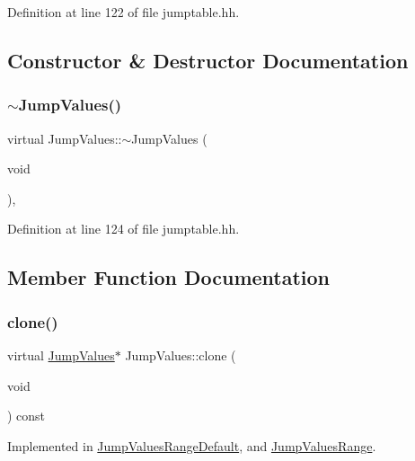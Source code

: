 Definition at line 122 of file jumptable.\+hh.



\subsection{Constructor \& Destructor Documentation}
\mbox{\label{class_jump_values_a690f7467bd51de193ab5f4f82a615296}} 
\subsubsection{\texorpdfstring{$\sim$JumpValues()}{~JumpValues()}}
{\footnotesize\ttfamily virtual Jump\+Values\+::$\sim$\+Jump\+Values (\begin{DoxyParamCaption}\item[{void}]{ }\end{DoxyParamCaption})\hspace{0.3cm}{\ttfamily [inline]}, {\ttfamily [virtual]}}



Definition at line 124 of file jumptable.\+hh.



\subsection{Member Function Documentation}
\mbox{\label{class_jump_values_adfe4b22f78bedc2e90488a820dd86d3e}} 
\subsubsection{\texorpdfstring{clone()}{clone()}}
{\footnotesize\ttfamily virtual \mbox{\hyperlink{class_jump_values}{Jump\+Values}}$\ast$ Jump\+Values\+::clone (\begin{DoxyParamCaption}\item[{void}]{ }\end{DoxyParamCaption}) const\hspace{0.3cm}{\ttfamily [pure virtual]}}



Implemented in \mbox{\hyperlink{class_jump_values_range_default_ac0169c2a1146293eac5fc316411398ba}{Jump\+Values\+Range\+Default}}, and \mbox{\hyperlink{class_jump_values_range_a1e22013b45547017b47758fd8901b0ef}{Jump\+Values\+Range}}.

